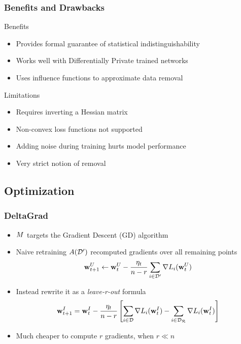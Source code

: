 \documentclass[pdf]{beamer}
\begin{document}
\begin{frame}
  \frametitle{Benefits and Drawbacks}
  \begin{block}{Benefits}
    \begin{itemize}
      \item Provides formal guarantee of statistical indistinguishability
      \item Works well with Differentially Private trained networks
      \item Uses influence functions to approximate data removal
    \end{itemize}    
  \end{block}
  \begin{alertblock}{Limitations}
    \begin{itemize}
      \item Requires inverting a Hessian matrix
      \item Non-convex loss functions not supported 
      \item Adding noise during training hurts model performance
      \item Very strict notion of removal
    \end{itemize}
    
  \end{alertblock}
\end{frame}
\subsection{Optimization}
\begin{frame}
  \myNset[2]
  \smartart
\end{frame}

\begin{frame}
  \frametitle{
    DeltaGrad \cite{wuDeltaGradRapidRetraining2020}
    }
  \begin{itemize}
    \item $M$ targets the Gradient Descent (GD) algorithm
    \item Naive retraining $A(\mathcal{D}^{\prime})$ recomputed gradients over all remaining points
    \[
        \textbf{w}^{U}_{t+1} \leftarrow \textbf{w}^{U}_{t} - \frac{\eta_{t}}{n-r}\sum_{i\in \mathcal{D}^{\prime}}\nabla L_{i}(\textbf{w}^{U}_{t})
    \]
    \item Instead rewrite it as a \textit{leave-r-out} formula
    \[
      \textbf{w}^{I}_{t+1} = \textbf{w}^{I}_{t} - \frac{\eta_{t}}{n-r}\left[\sum_{i\in \mathcal{D}}\nabla L_{i}(\textbf{w}^{I}_{t}) -\sum_{i\in \mathcal{D_{R}}} \nabla L_{i}(\textbf{w}^{I}_{t})\right]
    \]
    \item Much cheaper to compute $r$ gradients, when $r \ll n$
  \end{itemize}

\end{frame}
\end{document}
